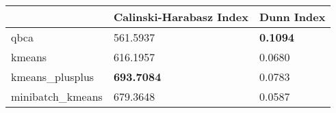 \begin{table}[htbp]
\centering
\begin{tabular}{lll}
\toprule
 & Calinski-Harabasz Index & Dunn Index \\
\midrule
qbca & 561.5937 & \textbf{0.1094} \\
kmeans & 616.1957 & 0.0680 \\
kmeans_plusplus & \textbf{693.7084} & 0.0783 \\
minibatch_kmeans & 679.3648 & 0.0587 \\
\bottomrule
\end{tabular}
\end{table}
